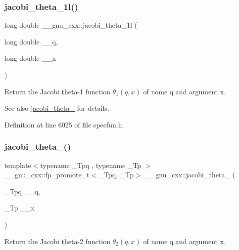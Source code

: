 \subsubsection{\texorpdfstring{jacobi\+\_\+theta\+\_\+1l()}{jacobi\_theta\_1l()}}
{\footnotesize\ttfamily long double \+\_\+\+\_\+gnu\+\_\+cxx\+::jacobi\+\_\+theta\+\_\+1l (\begin{DoxyParamCaption}\item[{long double}]{\+\_\+\+\_\+q,  }\item[{long double}]{\+\_\+\+\_\+x }\end{DoxyParamCaption})\hspace{0.3cm}{\ttfamily [inline]}}

Return the Jacobi theta-\/1 function $ \theta_1(q,x) $ of nome {\ttfamily q} and argument {\ttfamily x}.

\begin{DoxySeeAlso}{See also}
\hyperlink{group__mathsf__gnu_ga996ca8c1fff75e2d4f196e99e0919933}{jacobi\+\_\+theta\+\_} for details. 
\end{DoxySeeAlso}


Definition at line 6025 of file specfun.\+h.

\mbox{\label{group__mathsf__gnu_gaf6b13dac1f112a870299d75cb4cf42cc}} 
\subsubsection{\texorpdfstring{jacobi\+\_\+theta\+\_()}{jacobi\_theta\_2()}}
{\footnotesize\ttfamily template$<$typename \+\_\+\+Tpq , typename \+\_\+\+Tp $>$ \\
\+\_\+\+\_\+gnu\+\_\+cxx\+::fp\+\_\+promote\+\_\+t$<$\+\_\+\+Tpq, \+\_\+\+Tp$>$ \+\_\+\+\_\+gnu\+\_\+cxx\+::jacobi\+\_\+theta\+\_ (\begin{DoxyParamCaption}\item[{\+\_\+\+Tpq}]{\+\_\+\+\_\+q,  }\item[{\+\_\+\+Tp}]{\+\_\+\+\_\+x }\end{DoxyParamCaption})\hspace{0.3cm}{\ttfamily [inline]}}

Return the Jacobi theta-\/2 function $ \theta_2(q,x) $ of nome {\ttfamily q} and argument {\ttfamily x}.

